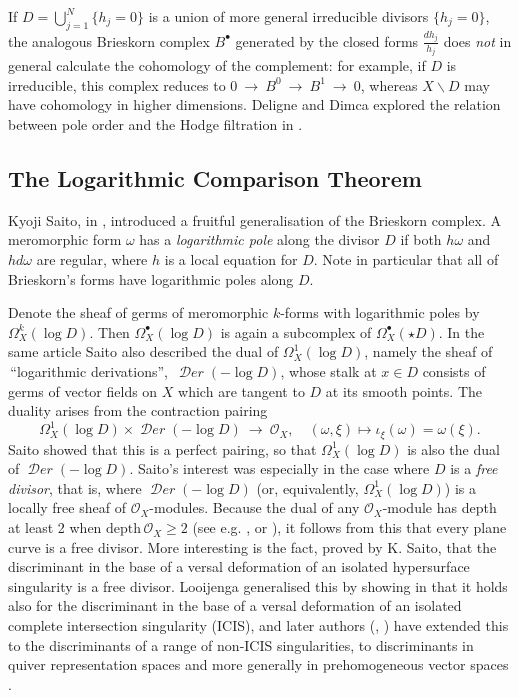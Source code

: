 \documentclass[12pt]{article}
\DeclareMathOperator{\fDer}{\mathcal{D}\mathit{er}}
\newcommand{\OO}{\mathcal{O}}
\newcommand{\cO}{\OO}
\newcommand\bu{\bullet}
\newcommand\ssm{\smallsetminus}
\newcommand\depth{{\mbox{depth}}}
\newcommand\tos{{\ \rightarrow\ }}
\begin{document}
If $D=\bigcup_{j=1}^N\{h_j=0\}$ is a union of more general irreducible divisors $\{h_j=0\}$, the analogous Brieskorn complex $B^\bu$ generated by the closed forms $\frac{dh_j}{h_j}$ does {\it not} in general calculate the cohomology of the complement: for example, if $D$ is irreducible, this complex reduces to $0\tos B^0\tos B^1\tos 0$, whereas $X\ssm D$ may have cohomology in higher dimensions. Deligne and Dimca
explored the relation between pole order and the Hodge filtration in \cite{deldim}.

\subsection{The Logarithmic Comparison Theorem}\label{LCTfirst}
Kyoji Saito, in \cite{Saito-80},  introduced a fruitful generalisation of the Brieskorn complex. A meromorphic form $\omega$ has a {\it logarithmic pole} along the divisor $D$ if both $h{\omega}$ and $hd{\omega}$ are regular, where $h$ is a local equation for $D$. Note in particular that all of Brieskorn's forms have logarithmic poles along $D$.

Denote the sheaf of germs of meromorphic $k$-forms with logarithmic poles by $\Omega^k_X(\log D)$. Then $\Omega_X^\bu(\log D)$ is again a subcomplex of  $\Omega_X^\bu(\star D)$. In the same article Saito also described the dual of $\Omega_X^1(\log D)$, namely the sheaf of \,``logarithmic derivations'',\,  $\fDer(-\log D)$, whose stalk at $x\in D$ consists of germs of vector fields on $X$ which are tangent to $D$ at its smooth points. The duality arises from the contraction pairing
$$\Omega_X^1(\log D)\times \fDer(-\log D)\tos \OO_X, \quad({\omega},\xi)\mapsto \iota_\xi(\omega)={\omega}(\xi).$$
Saito showed that this is a perfect pairing, so that $\Omega_X^1(\log D)$ is also the dual of $\fDer(-\log D)$.  Saito's interest was especially in the case where $D$ is a {\it free divisor}, that is, where $\fDer(-\log D)$ (or, equivalently, $\Omega_X^1(\log D)$) is a locally free sheaf of $\OO_X$-modules. Because the dual of any $\OO_X$-module has depth at least 2 when $\depth\, \cO_X \geq 2$ (see e.g. \cite{schless}, or
\cite[Lemma 9.2]{looij}), it follows from this that every plane curve is a free divisor. More interesting is the fact, proved by K. Saito, that the discriminant in the base of a versal deformation of an isolated hypersurface singularity is a free divisor. Looijenga generalised this by showing in \cite[Corollary 6.13]{looij} that it holds also for the discriminant in the base of a versal deformation of an isolated complete intersection singularity (ICIS), and later authors (\cite{vans}, \cite{bebo}) have extended this to the discriminants of a range of non-ICIS singularities, to discriminants in quiver representation spaces \cite{bm} and more generally in prehomogeneous vector spaces \cite{gms}.
\end{document}

